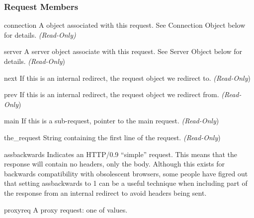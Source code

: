 \subsubsection{Request Members\label{pyapi-mprequest-mem}}

\begin{memberdesc}[request]{connection}
  A  object associated with this request. See
  Connection Object below for details.
  \emph{(Read-Only)}
\end{memberdesc}

\begin{memberdesc}[request]{server}
  A server object associate with this request. See Server Object below
  for details.
  \emph{(Read-Only})
\end{memberdesc}

\begin{memberdesc}[request]{next}
  If this is an internal redirect, the request object we redirect to. 
  \emph{(Read-Only})
\end{memberdesc}

\begin{memberdesc}[request]{prev}
  If this is an internal redirect, the request object we redirect from.
  \emph{(Read-Only})
\end{memberdesc}

\begin{memberdesc}[request]{main}
  If this is a sub-request, pointer to the main request. 
  \emph{(Read-Only})
\end{memberdesc}

\begin{memberdesc}[request]{the_request}
  String containing the first line of the request.
  \emph{(Read-Only})
\end{memberdesc}

\begin{memberdesc}[request]{assbackwards}
  Indicates an HTTP/0.9 ``simple'' request. This means that the
  response will contain no headers, only the body. Although this
  exists for backwards compatibility with obsolescent browsers, some
  people have figred out that setting assbackwards to 1 can be a
  useful technique when including part of the response from an
  internal redirect to avoid headers being sent.
\end{memberdesc}

\begin{memberdesc}[request]{proxyreq}
  A proxy request: one of  values.
\end{memberdesc}

